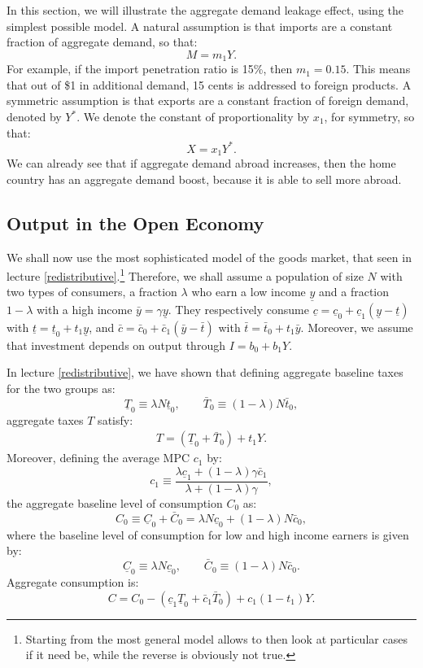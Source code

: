 \documentclass[]{book}
\let\rmarkdownfootnote\footnote%
\def\footnote{\protect\rmarkdownfootnote}
\begin{document}
In this section, we will illustrate the aggregate demand leakage effect,
using the simplest possible model. A natural assumption is that imports
are a constant fraction of aggregate demand, so that: \[M = m_1 Y.\] For
example, if the import penetration ratio is 15\%, then \(m_1 = 0.15\).
This means that out of \$1 in additional demand, 15 cents is addressed
to foreign products. A symmetric assumption is that exports are a
constant fraction of foreign demand, denoted by \(Y^{*}\). We denote the
constant of proportionality by \(x_1\), for symmetry, so that:
\[X=x_1 Y^{*}.\] We can already see that if aggregate demand abroad
increases, then the home country has an aggregate demand boost, because
it is able to sell more abroad.

\subsection{Output in the Open Economy}\label{output-open}

We shall now use the most sophisticated model of the goods market, that
seen in lecture \ref{redistributive}.\footnote{Starting from the most
  general model allows to then look at particular cases if it need be,
  while the reverse is obviously not true.} Therefore, we shall assume a
population of size \(N\) with two types of consumers, a fraction
\(\lambda\) who earn a low income \(\underline{y}\) and a fraction
\(1-\lambda\) with a high income \(\bar{y}=\gamma \underline{y}\). They
respectively consume
\(\underline{c} = \underline{c}_0 + \underline{c}_1 (\underline{y} - \underline{t})\)
with \(\underline{t} = \underline{t}_0 + t_1 \underline{y}\), and
\(\bar{c} = \bar{c}_0 + \bar{c}_1 (\bar{y} - \bar{t})\) with
\(\bar{t} = \bar{t}_0 + t_1 \bar{y}\). Moreover, we assume that
investment depends on output through \(I=b_0+b_1 Y\).

In lecture \ref{redistributive}, we have shown that defining aggregate
baseline taxes for the two groups as:
\[\underline{T}_0\equiv\lambda  N \underline{t}_0, \qquad \bar{T}_0\equiv(1-\lambda) N \bar{t}_0,\]
aggregate taxes \(T\) satisfy: \[
\begin{aligned}
\boxed{T=\left(\underline{T}_{0}+\bar{T}_{0}\right)+t_1 Y}.
\end{aligned}
\] Moreover, defining the average MPC \(c_1\) by:
\[c_{1}\equiv\frac{\lambda\underline{c}_{1}+\left(1-\lambda\right)\gamma\bar{c}_{1}}{\lambda+(1-\lambda)\gamma},\]
the aggregate baseline level of consumption \(C_0\) as:
\[C_{0} \equiv \underline{C}_0 +  \bar{C}_0 = \lambda  N \underline{c}_0 + (1-\lambda) N \bar{c}_0,\]
where the baseline level of consumption for low and high income earners
is given by:
\[\underline{C}_0\equiv \lambda  N \underline{c}_0, \qquad \bar{C}_0\equiv (1-\lambda) N \bar{c}_0.\]
Aggregate consumption is:
\[\boxed{C = C_0 -\left(\underline{c}_{1}\underline{T}_0+\bar{c}_{1}\bar{T}_0\right)+c_1 (1-t_1) Y}.\]
\end{document}
